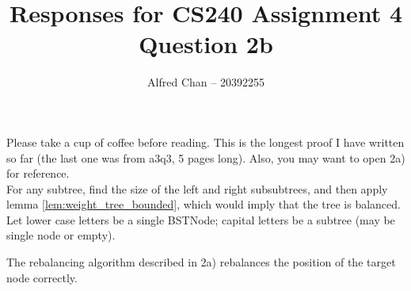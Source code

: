 \documentclass[12pt]{article}
\title{Responses for CS240 Assignment 4 Question 2b}
\author{Alfred Chan -- 20392255}
\begin{document}
\maketitle
{} Please take a cup of coffee before reading. This is the longest proof I have written so far (the last one was from a3q3, 5 pages long). Also, you may want to open 2a) for reference.\\

 For any subtree, find the size of the left and right subsubtrees, and then apply lemma \ref{lem:weight_tree_bounded}, which would imply that the tree is balanced.\\

 Let lower case letters be a single BSTNode; capital letters be a subtree (may be single node or empty).\\



\begin{thm}
The rebalancing algorithm described in 2a) rebalances the position of the target node correctly.
\end{thm}
\end{document}

